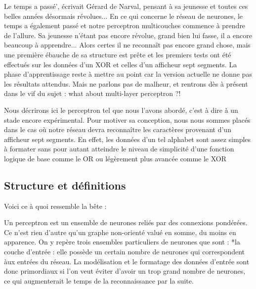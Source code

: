 \documentclass[a4paper,10pt]{report}
\begin{document}
Le temps a pass\'e', \'ecrivait G\'erard de Narval, pensant \`a sa jeunesse
et toutes ces belles ann\'ees d\'esormais r\'evolues... En ce qui
concerne le r\'eseau de neurones, le temps a \'egalement pass\'e et
notre perceptron multicouches commence \`a prendre de l'allure. Sa
jeunesse n'\'etant pas encore r\'evolue, grand bien lui fasse, il a
encore beaucoup \`a apprendre... Alors
certes il ne reconna\^it pas encore grand chose, mais une premi\`ere
\'ebauche de sa structure est pr\^ete et les premiers tests ont \'et\'e
effectu\'es sur les donn\'ees d'un XOR et celles d'un afficheur sept
segments. La phase d'apprentissage reste \`a mettre au point car la
version actuelle ne donne pas les r\'esultats attendus. Mais ne parlons
pas de malheur, et rentrons d\`es \`a pr\'esent dans le vif du sujet : what about
multi-layer perceptron ?! 

Nous d\'ecrirons ici le perceptron tel que nous l'avons abord\'e, c'est \`a
dire \`a un stade encore exp\'erimental. Pour motiver sa conception,
nous nous sommes plac\'es dans le cas o\`u notre r\'eseau devra
reconna\^itre les caract\`eres provenant d'un afficheur sept
segments. En effet, les donn\'ees d'un tel alphabet sont assez simples
\`a formater sans pour autant atteindre le niveau de simplicit\'e d'une
fonction logique de base comme le OR ou l\'eg\`erement plus avanc\'ee
comme le XOR


\subsection{Structure et d\'efinitions} %
\label{subsec:structure_et_definitions}

Voici ce \`a quoi ressemble la b\^ete :

Un perceptron est un ensemble de neurones reli\'es par des connexions
pond\'er\'ees. Ce n'est rien d'autre qu'un graphe non-orient\'e valu\'e
en somme, du moins en apparence. On y rep\`ere trois ensembles
particuliers de neurones que sont : 
*la couche d'entr\'ee : elle poss\`ede un certain nombre de neurones qui
correspondent \`aux entr\'ees du r\'eseau. La mod\'elisation et le
formatage des donn\'ees d'entr\'ee sont donc primordiaux si l'on veut
\'eviter d'avoir un trop grand nombre de neurones, ce qui augmenterait
le temps de la reconnaissance par la suite.
\end{document}

